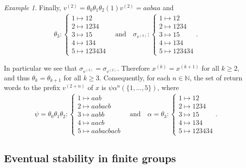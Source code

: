 \documentclass{amsart}
\newcommand*{\nn}{\mathbb{N}}
\newcommand*{\from}{\colon}
\newcommand{\displaysub}[1]{\begin{cases}#1\end{cases}}
\theoremstyle{plain}
\theoremstyle{definition}
\theoremstyle{remark}
\newtheorem{example}[theorem]{Example}
\begin{document}
\begin{example}
    Finally, $v^{(2)}=\theta_0\theta_1\theta_2(1)v^{(2)} = aabaa$ and
    \begin{align*}
        \theta_3 \from \displaysub{ 1\mapsto 12 \\ 2\mapsto 1234 \\ 3\mapsto 15 \\ 4\mapsto 134 \\ 5\mapsto 123434 }
            \quad\text{and}\quad
        \sigma_{v^{(3)}} \from \displaysub{ 1\mapsto 12 \\ 2\mapsto 1234 \\ 3\mapsto 15 \\ 4\mapsto 134 \\ 5\mapsto 123434 }.
    \end{align*}
    
    In particular we see that $\sigma_{v^{(3)}} = \sigma_{v^{(2)}}$. Therefore $x^{(k)}=x^{(k+1)}$ for all $k\geq 2$, and thus $\theta_k = \theta_{k+1}$ for all $k\geq 3$. Consequently, for each $n\in\nn$, the set of return words to the prefix $v^{(2+n)}$ of $x$ is $\psi\alpha^n(\{1,\dots,5\})$, where
    \begin{align*}
        \psi=\theta_0\theta_1\theta_2 \from\displaysub{ 1\mapsto aab \\ 2\mapsto aabacb \\ 3\mapsto aabb \\ 4\mapsto aacb \\ 5\mapsto aabacbacb }
            \quad\text{and}\quad
        \alpha=\theta_3 \from \displaysub{ 1\mapsto 12 \\ 2\mapsto 1234 \\ 3\mapsto 15 \\ 4\mapsto 134 \\ 5\mapsto 123434 }.
    \end{align*}
\end{example}

\subsection{Eventual stability in finite groups}\label{ss:decidability for finite groups}
\end{document}
